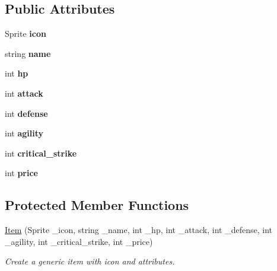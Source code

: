 \subsection*{Public Attributes}
\begin{DoxyCompactItemize}
\item 
\mbox{\label{class_item_af1dc016532d298122f97471dc66c2c81}} 
Sprite {\bfseries icon}
\item 
\mbox{\label{class_item_a86a80b030e63ac2d31f3576ed8d1be51}} 
string {\bfseries name}
\item 
\mbox{\label{class_item_a8ac358b3db5252f0f4cef2422e301fe4}} 
int {\bfseries hp}
\item 
\mbox{\label{class_item_a3ce7a0eeab152f61639403838f05f0cc}} 
int {\bfseries attack}
\item 
\mbox{\label{class_item_af408dfdaffd7c3e1920615c9ad124079}} 
int {\bfseries defense}
\item 
\mbox{\label{class_item_a0fcb0d0a27623f05cfb0e2ac06135d86}} 
int {\bfseries agility}
\item 
\mbox{\label{class_item_a925e7d3f5b5ad9195d17e4db303f86f1}} 
int {\bfseries critical\+\_\+strike}
\item 
\mbox{\label{class_item_a371a0aed2415a1b8adf020707a38ab76}} 
int {\bfseries price}
\end{DoxyCompactItemize}
\subsection*{Protected Member Functions}
\begin{DoxyCompactItemize}
\item 
\mbox{\label{class_item_a26abe7b7a300340375a3bec714cfdd5c}} 
\mbox{\hyperlink{class_item_a26abe7b7a300340375a3bec714cfdd5c}{Item}} (Sprite \+\_\+icon, string \+\_\+name, int \+\_\+hp, int \+\_\+attack, int \+\_\+defense, int \+\_\+agility, int \+\_\+critical\+\_\+strike, int \+\_\+price)
\begin{DoxyCompactList}\small\item\em Create a generic item with icon and attributes. \end{DoxyCompactList}\end{DoxyCompactItemize}


